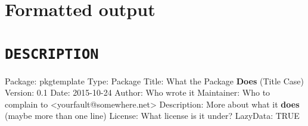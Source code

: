 \documentclass[]{book}
\newenvironment{Shaded}{\begin{snugshade}}{\end{snugshade}}
\newcommand{\KeywordTok}[1]{\textcolor[rgb]{0.13,0.29,0.53}{\textbf{{#1}}}}
\newcommand{\DecValTok}[1]{\textcolor[rgb]{0.00,0.00,0.81}{{#1}}}
\newcommand{\FloatTok}[1]{\textcolor[rgb]{0.00,0.00,0.81}{{#1}}}
\newcommand{\StringTok}[1]{\textcolor[rgb]{0.31,0.60,0.02}{{#1}}}
\newcommand{\OtherTok}[1]{\textcolor[rgb]{0.56,0.35,0.01}{{#1}}}
\newcommand{\NormalTok}[1]{{#1}}
\theoremstyle{definition}
\theoremstyle{definition}
\theoremstyle{definition}
\theoremstyle{remark}
\begin{document}
\begin{Shaded}
\end{Shaded}

\section{Formatted output}\label{formatted-output}

\section{\texorpdfstring{\texttt{DESCRIPTION}}{DESCRIPTION}}\label{description}

\begin{Shaded}
\begin{Highlighting}[]
\NormalTok{Package:}\StringTok{ }\NormalTok{pkgtemplate}
\NormalTok{Type:}\StringTok{ }\NormalTok{Package}
\NormalTok{Title:}\StringTok{ }\NormalTok{What the Package }\KeywordTok{Does} \NormalTok{(Title Case)}
\NormalTok{Version:}\StringTok{ }\FloatTok{0.1}
\NormalTok{Date:}\StringTok{ }\DecValTok{2015-10-24}
\NormalTok{Author:}\StringTok{ }\NormalTok{Who wrote it}
\NormalTok{Maintainer:}\StringTok{ }\NormalTok{Who to complain to <yourfault@somewhere.net>}
\NormalTok{Description:}\StringTok{ }\NormalTok{More about what it }\KeywordTok{does} \NormalTok{(maybe more than one line)}
\NormalTok{License:}\StringTok{ }\NormalTok{What license is it under?}
\NormalTok{LazyData:}\StringTok{ }\OtherTok{TRUE}
\end{Highlighting}
\end{Shaded}
\end{document}

